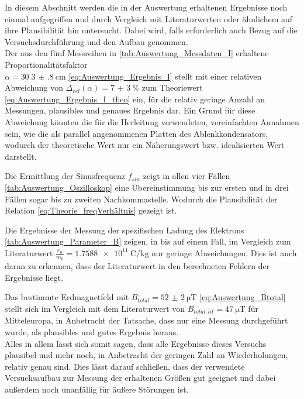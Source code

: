 In diesem Abschnitt werden die in der Auswertung erhaltenen Ergebnisse 
noch einmal aufgegriffen und durch Vergleich mit Literaturwerten 
oder ähnlichem auf ihre Plausibilität hin untersucht. Dabei 
wird, falls erforderlich auch Bezug auf die Versuchsdurchführung 
und den Aufbau genommen. \\

Der aus den fünf Messreihen in \cref{tab:Auswertung_Messdaten_I} erhaltene Proportionalitätsfaktor\\  $ \alpha = \SI{30.3(8)}{\centi\meter}$ \cref{eq:Auswertung_Ergebnis_I} 
stellt mit einer relativen Abweichung von $\Delta_{rel}(\alpha) = \SI{7(3)}{\percent}$ zum 
Theoriewert \cref{eq:Auswertung_Ergebnis_I_theo} ein, für die relativ geringe Anzahl an Messungen, 
plausibles und genaues Ergebnis dar.
Ein Grund für diese Abweichung könnten die für die Herleitung verwendeten, vereinfachten 
Annahmen sein, wie die als parallel angenommenen Platten des Ablenkkondensators, wodurch 
der theoretische Wert nur ein Näherungswert bzw. idealisierten Wert darstellt.


Die Ermittlung der Sinusfrequenz $f_{sin}$ zeigt in allen vier Fällen 
\cref{tab:Auswertung_Oszilloskop} eine Übereinstimmung bis zur ersten und
in drei Fällen sogar bis zu zweiten Nachkommastelle. Wodurch die
Plausibilität der Relation \cref{eq:Theorie_freqVerhältnis} gezeigt ist.

Die Ergebnisse der Messung der spezifischen Ladung des Elektrons 
\cref{tab:Auswertung_Parameter_B} zeigen, in bis auf einem Fall, 
im Vergleich zum Literaturwert
$\frac{e_{0}}{m_{0}} = \SI{1.7588e11}{\coulomb\per\kilo\g}$\cite{Mende09} nur geringe Abweichungen.
Dies ist auch daran zu erkennen, dass der Literaturwert in den berechneten 
Fehlern der Ergebnisse liegt.

Das bestimmte Erdmagnetfeld mit $B_{total} =  \SI{52(2)}{\micro\tesla}$ 
\cref{eq:Auswertung_Btotal} stellt sich im Vergleich mit dem Literaturwert von
$B_{total,lit} = \SI{47}{\micro\tesla}$ \cite{GGU} für Mitteleuropa,
in Anbetracht der Tatsache, dass nur eine Messung durchgeführt wurde, als 
plausibles und gutes Ergebnis heraus. \\

Alles in allem lässt sich somit sagen, dass alle Ergebnisse dieses Versuchs
plausibel und mehr noch, in Anbetracht der geringen Zahl an Wiederholungen,
relativ genau sind. Dies lässt darauf schließen, dass der verwendete Versuchsaufbau
zur Messung der erhaltenen Größen gut geeignet und dabei außerdem noch unanfällig
für äußere Störungen ist.   
